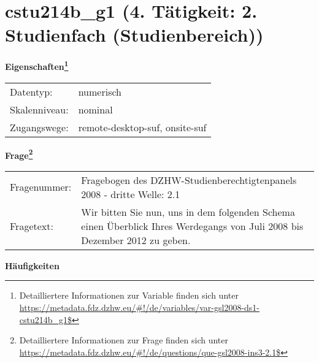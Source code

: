
    \setcounter{footnote}{0}

    \vspace*{-1.8cm}
	\section{cstu214b\_g1 (4. Tätigkeit: 2. Studienfach (Studienbereich))}
	\label{section:cstu214b_g1}



    \vspace*{0.5cm}
    \noindent\textbf{Eigenschaften\footnote{Detailliertere Informationen zur Variable finden sich unter
		\url{https://metadata.fdz.dzhw.eu/\#!/de/variables/var-gsl2008-ds1-cstu214b_g1$}}}\\
	\begin{tabularx}{\hsize}{@{}lX}
	Datentyp: & numerisch \\
	Skalenniveau: & nominal \\
	Zugangswege: &
	  remote-desktop-suf, 
	  onsite-suf
 \\
    \end{tabularx}



				\vspace*{0.5cm}
                \noindent\textbf{Frage\footnote{Detailliertere Informationen zur Frage finden sich unter
		              \url{https://metadata.fdz.dzhw.eu/\#!/de/questions/que-gsl2008-ins3-2.1$}}}\\
				\begin{tabularx}{\hsize}{@{}lX}
					Fragenummer: &
					  Fragebogen des DZHW-Studienberechtigtenpanels 2008 - dritte Welle:
					  2.1
 \\
					Fragetext: & Wir bitten Sie nun, uns in dem folgenden Schema einen Überblick Ihres Werdegangs von Juli 2008 bis Dezember 2012 zu geben. \\
				\end{tabularx}





        		\vspace*{0.5cm}
                \noindent\textbf{Häufigkeiten}

